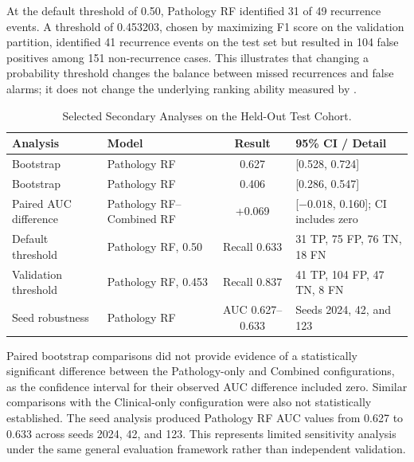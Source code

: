 \documentclass[11pt,a4paper]{article}
\newcommand{\ROC}{\text{ROC-AUC}}
\newcommand{\AUPRC}{\text{AUPRC}}
\begin{document}
At the default threshold of 0.50, Pathology RF identified 31 of 49 recurrence events. A threshold of 0.453203, chosen by maximizing F1 score on the validation partition, identified 41 recurrence events on the test set but resulted in 104 false positives among 151 non-recurrence cases. This illustrates that changing a probability threshold changes the balance between missed recurrences and false alarms; it does not change the underlying ranking ability measured by \ROC{}.

\begin{table}[htbp]

\centering

\small

\caption{Selected Secondary Analyses on the Held-Out Test Cohort.}

\label{tab:secondary}

\scriptsize

\begin{tabularx}{\linewidth}{@{}l l c X@{}}

\toprule

\textbf{Analysis} & \textbf{Model} & \textbf{Result} & \textbf{95\% CI / Detail} \\

\midrule

Bootstrap \ROC{} & Pathology RF & 0.627 & [0.528, 0.724] \\

Bootstrap \AUPRC{} & Pathology RF & 0.406 & [0.286, 0.547] \\

Paired AUC difference & Pathology RF--Combined RF & +0.069 & [$-0.018$, 0.160]; CI includes zero \\

Default threshold & Pathology RF, 0.50 & Recall 0.633 & 31 TP, 75 FP, 76 TN, 18 FN \\

Validation threshold & Pathology RF, 0.453 & Recall 0.837 & 41 TP, 104 FP, 47 TN, 8 FN \\

Seed robustness & Pathology RF & AUC 0.627--0.633 & Seeds 2024, 42, and 123 \\

\bottomrule

\end{tabularx}

\end{table}

Paired bootstrap comparisons did not provide evidence of a statistically significant \ROC{} difference between the Pathology-only and Combined configurations, as the confidence interval for their observed AUC difference included zero. Similar comparisons with the Clinical-only configuration were also not statistically established. The seed analysis produced Pathology RF AUC values from 0.627 to 0.633 across seeds 2024, 42, and 123. This represents limited sensitivity analysis under the same general evaluation framework rather than independent validation.
\end{document}
